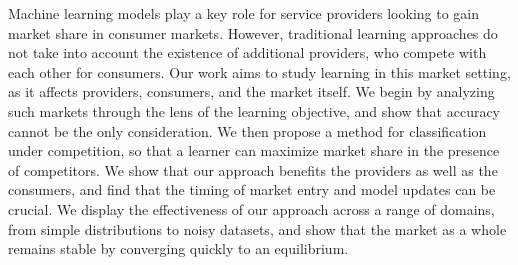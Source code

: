

Machine learning models play a key role for service providers looking to gain market share in consumer markets. However, traditional learning approaches do not take into account the existence of additional providers, who compete with each other for consumers.
Our work aims to study learning in this market setting,
as it affects providers, consumers, and the market itself.
We begin by analyzing such markets through the lens of the learning objective,
and show that accuracy cannot be the only consideration.
We then propose a method for classification under competition,
so that a learner can maximize market share in the presence of competitors. 
We show that our approach benefits the providers as well as the consumers,
and find that the timing of market entry and model updates can 
be crucial.
We display the effectiveness of our approach across a range of domains,
from simple distributions to noisy datasets,
and show that the market as a whole remains stable by converging quickly to  an equilibrium.





